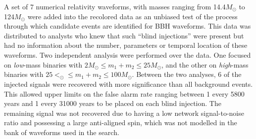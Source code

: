 A set of 7 numerical relativity waveforms, with
masses ranging from 14.4$M_{\odot}$ to 124$M_{\odot}$ were added into
the recolored data as an unbiased test of the process through which candidate 
events are identified for BBH waveforms. This 
data was distributed to analysts who
knew that such ``blind injections'' were present but had no
information about the number, parameters or temporal location of these
waveforms. 
Two independent \ihope{} analysis were performed over the data.
One focused on {\it low}-mass binaries with 
$2M_\odot\leq m_1+m_2\leq 25M_\odot$, and the other on {\it high}-mass
binaries with $25<_\odot\leq m_1+m_2\leq 100M_\odot$.
Between the two analyses, 6 of the injected 
signals were recovered with more significance than all background
events. This allowed upper limits on the false alarm rate ranging
between 1 every 5800 years and 1 every 31000 years to be placed on
each blind injection. The remaining signal was not recovered due to
having a low network signal-to-noise ratio and possessing a large
anti-aligned spin, which was not modelled in the bank of waveforms used in the 
search.
% 
